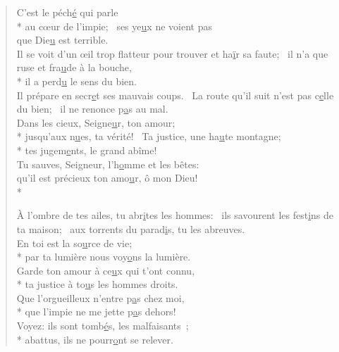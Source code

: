 
\begin{verse}
C’est le péch\underline{é} qui parle \\*
au cœur de l’impie;~\psalmstar
ses ye\underline{u}x ne voient pas \\
que Die\underline{u} est terrible. \\

Il se voit d’un œil trop flatteur
pour trouver et ha\underline{ï}r sa faute;~\psalmstar
{}il n’a que ruse et fra\underline{u}de à la bouche, \\*
il a perd\underline{u} le sens du bien. \\

Il prépare en secr\underline{e}t ses mauvais coups.~\psalmdagger
La route qu’il suit n’est pas c\underline{e}lle du bien;~\psalmstar
il ne renonce p\underline{a}s au mal. \\

Dans les cieux, Seigne\underline{u}r, ton amour; \\*
jusqu’aux n\underline{u}es, ta vérité!~\psalmstar
{}Ta justice, une ha\underline{u}te montagne; \\*
tes jugem\underline{e}nts, le grand abîme! \\

Tu sauves, Seigneur, l’h\underline{o}mme et les bêtes: \\
qu’il est précieux ton amo\underline{u}r, ô mon Dieu! \\*

À l’ombre de tes ailes, tu abr\underline{i}tes les hommes:~\psalmdagger
{}ils savourent les fest\underline{i}ns de ta maison;~\psalmstar
aux torrents du parad\underline{i}s, tu les abreuves. \\

En toi est la so\underline{u}rce de vie; \\*
par ta lumière nous voy\underline{o}ns la lumière. \\

Garde ton amour à ce\underline{u}x qui t’ont connu, \\*
ta justice à to\underline{u}s les hommes droits. \\

Que l’orgueilleux n’entre p\underline{a}s chez moi, \\*
que l’impie ne me jette p\underline{a}s dehors! \\

Voyez: ils sont tomb\underline{é}s, les malfaisants ; \\*
abattus, ils ne pourr\underline{o}nt se relever. \\
\end{verse}


